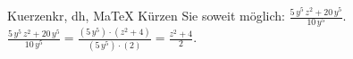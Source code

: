 \begin{MAufgabe}{Kuerzen}{kr, dh, MaTeX}
K\"urzen Sie soweit m\"oglich: $\frac{5\, y^5\, z^2 + 20\, y^5}{10\, y^5}$.\\ 
\ifLsg\MLoesung
\quad $\frac{5\, y^5\, z^2 + 20\, y^5}{10\, y^5}=\frac{(5\, y^5)\cdot(z^2 + 4)}{(5\, y^5)\cdot(2)}=\frac{z^2 + 4}{2}$.\else\relax\fi
 \end{MAufgabe}